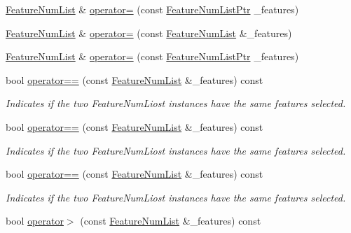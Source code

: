\begin{DoxyCompactItemize}
\item 
\hyperlink{class_k_k_m_l_l_1_1_feature_num_list}{Feature\+Num\+List} \& \hyperlink{class_k_k_m_l_l_1_1_feature_num_list_a399754c78ae17ccdab902505ec03aa17}{operator=} (const \hyperlink{class_k_k_m_l_l_1_1_feature_num_list_a8c7e53951a6f552a3f5e45c599ef05be}{Feature\+Num\+List\+Ptr} \+\_\+features)
\item 
\hyperlink{class_k_k_m_l_l_1_1_feature_num_list}{Feature\+Num\+List} \& \hyperlink{class_k_k_m_l_l_1_1_feature_num_list_a76474357e9d29d64cfa41a82114499ab}{operator=} (const \hyperlink{class_k_k_m_l_l_1_1_feature_num_list}{Feature\+Num\+List} \&\+\_\+features)
\item 
\hyperlink{class_k_k_m_l_l_1_1_feature_num_list}{Feature\+Num\+List} \& \hyperlink{class_k_k_m_l_l_1_1_feature_num_list_a399754c78ae17ccdab902505ec03aa17}{operator=} (const \hyperlink{class_k_k_m_l_l_1_1_feature_num_list_a8c7e53951a6f552a3f5e45c599ef05be}{Feature\+Num\+List\+Ptr} \+\_\+features)
\item 
bool \hyperlink{class_k_k_m_l_l_1_1_feature_num_list_a62ca08d14a1312e26be5a50799dfec1a}{operator==} (const \hyperlink{class_k_k_m_l_l_1_1_feature_num_list}{Feature\+Num\+List} \&\+\_\+features) const 
\begin{DoxyCompactList}\small\item\em Indicates if the two Feature\+Num\+Liost instances have the same features selected. \end{DoxyCompactList}\item 
bool \hyperlink{class_k_k_m_l_l_1_1_feature_num_list_a9b707f8b51785958fbd2ec8d38e16afb}{operator==} (const \hyperlink{class_k_k_m_l_l_1_1_feature_num_list}{Feature\+Num\+List} \&\+\_\+features) const 
\begin{DoxyCompactList}\small\item\em Indicates if the two Feature\+Num\+Liost instances have the same features selected. \end{DoxyCompactList}\item 
bool \hyperlink{class_k_k_m_l_l_1_1_feature_num_list_a9b707f8b51785958fbd2ec8d38e16afb}{operator==} (const \hyperlink{class_k_k_m_l_l_1_1_feature_num_list}{Feature\+Num\+List} \&\+\_\+features) const 
\begin{DoxyCompactList}\small\item\em Indicates if the two Feature\+Num\+Liost instances have the same features selected. \end{DoxyCompactList}\item 
bool \hyperlink{class_k_k_m_l_l_1_1_feature_num_list_a10d3ff81e2a2da64b842c44f390c8f2e}{operator$>$} (const \hyperlink{class_k_k_m_l_l_1_1_feature_num_list}{Feature\+Num\+List} \&\+\_\+features) const 

\end{DoxyCompactItemize}
